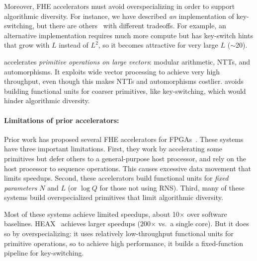 Moreover, FHE accelerators must avoid overspecializing in order to support algorithmic diversity.
For instance, we have described \emph{an} implementation of key-switching, but there are others~\cite{kim:jmir18:helr,gentry:crypto2012:homomorphic}
with different tradeoffs. %
For example, an alternative implementation requires much more compute
but has key-switch hints that grow with $L$ instead of $L^2$,
so it becomes attractive for very large $L$ ($\sim$20).

\name accelerates \emph{primitive operations on large vectors}:
modular arithmetic, NTTs, and automorphisms.
It exploits wide vector processing to achieve very high throughput, even though this makes NTTs and automorphisms costlier.
\name avoids building functional units for coarser primitives, like key-switching, which would hinder algorithmic diversity.

\paragraph{Limitations of prior accelerators:}
Prior work has proposed several FHE accelerators for FPGAs~\cite{cousins:hpec14:fpga-he,cousins:tetc17:fpga-he,doroz:tc15:accelerating-fhe,roy:hpca19:fpga-he,mert:tvlsi20:bfv-accel,migliore:tecs17:he-karatsuba,riazi:asplos20:heax,turan:tc20:heaws,mert:tvlsi20:bfv-accel}.
These systems have three important limitations.
First, they work by accelerating some primitives but defer others to a general-purpose host processor,
and rely on the host processor to sequence operations.
This causes excessive data movement that limits speedups.
Second, these accelerators build functional units for \emph{fixed parameters} $N$ and $L$ (or $\log Q$ for those not using RNS).
Third, many of these systems build overspecialized primitives that limit algorithmic diversity.

Most of these systems achieve limited speedups, about 10$\times$ over software baselines.
HEAX~\cite{riazi:asplos20:heax} achieves larger speedups (200$\times$ vs.\ a single core).
But it does so by overspecializing: it uses relatively low-throughput functional units for primitive operations, 
so to achieve high performance, it builds a fixed-function pipeline for key-switching.



